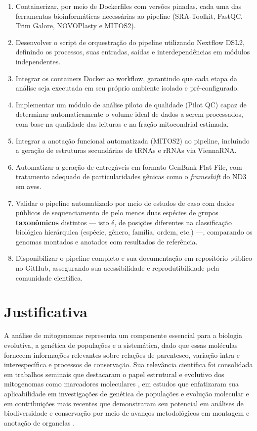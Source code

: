 \begin{enumerate}[label=\alph*)]
    \item Containerizar, por meio de Dockerfiles com versões pinadas, cada uma das ferramentas bioinformáticas necessárias ao pipeline (SRA-Toolkit, FastQC, Trim Galore, NOVOPlasty e MITOS2).
    \item Desenvolver o script de orquestração do pipeline utilizando Nextflow DSL2, definindo os processos, suas entradas, saídas e interdependências em módulos independentes.
    \item Integrar os containers Docker ao workflow, garantindo que cada etapa da análise seja executada em seu próprio ambiente isolado e pré-configurado.
    \item Implementar um módulo de análise piloto de qualidade (Pilot QC) capaz de determinar automaticamente o volume ideal de dados a serem processados, com base na qualidade das leituras e na fração mitocondrial estimada.
    \item Integrar a anotação funcional automatizada (MITOS2) ao pipeline, incluindo a geração de estruturas secundárias de tRNAs e rRNAs via ViennaRNA.
    \item Automatizar a geração de entregáveis em formato GenBank Flat File, com tratamento adequado de particularidades gênicas como o \textit{frameshift} do ND3 em aves.
    \item Validar o pipeline automatizado por meio de estudos de caso com dados públicos de sequenciamento de pelo menos duas espécies de grupos \textbf{taxonômicos} distintos --- isto é, de posições diferentes na classificação biológica hierárquica (espécie, gênero, família, ordem, etc.) ---, comparando os genomas montados e anotados com resultados de referência.
    \item Disponibilizar o pipeline completo e sua documentação em repositório público no GitHub, assegurando sua acessibilidade e reprodutibilidade pela comunidade científica.
\end{enumerate}

\section{Justificativa}

A análise de mitogenomas representa um componente essencial para a biologia evolutiva, a genética de populações e a sistemática, dado que essas moléculas fornecem informações relevantes sobre relações de parentesco, variação intra e interespecífica e processos de conservação. Sua relevância científica foi consolidada em trabalhos seminais que destacaram o papel estrutural e evolutivo dos mitogenomas como marcadores moleculares \cite{boore1999}, em estudos que enfatizaram sua aplicabilidade em investigações de genética de populações e evolução molecular \cite{ekblom2014} e em contribuições mais recentes que demonstraram seu potencial em análises de biodiversidade e conservação por meio de avanços metodológicos em montagem e anotação de organelas \cite{ulianosilva2023}.

